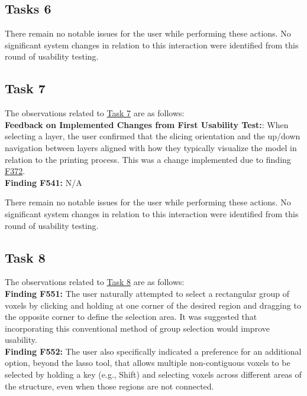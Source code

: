 \documentclass{article}
\begin{document}
\subsection{Tasks 6}

\noindent There remain no notable issues for the user while performing these actions. No significant system changes in relation to this interaction were identified from this round of usability testing.

\subsection{Task 7}

\noindent The observations related to \hyperlink{task:T7}{Task 7} are as follows:\\

\noindent \textbf{Feedback on Implemented Changes from First Usability Test:}: When selecting a layer, the user confirmed that the slicing orientation and the up/down navigation between layers aligned with how they typically visualize the model in relation to the printing process. This was a change implemented due to finding \hyperlink{finding:F372}{F372}.\\

\noindent \hypertarget{finding:F541}{\textbf{Finding F541:}} N/A

\noindent There remain no notable issues for the user while performing these actions. No significant system changes in relation to this interaction were identified from this round of usability testing.

\subsection{Task 8}

\noindent The observations related to \hyperlink{task:T8}{Task 8} are as follows:\\

\noindent \hypertarget{finding:F551}{\textbf{Finding F551:}} 
The user naturally attempted to select a rectangular group of voxels by clicking and holding at one corner of the desired region and dragging to the opposite corner to define the selection area. It was suggested that incorporating this conventional method of group selection would improve usability. \\

\noindent \hypertarget{finding:F552}{\textbf{Finding F552:}} 
The user also specifically indicated a preference for an additional option, beyond the lasso tool, that allows multiple non-contiguous voxels to be selected by holding a key (e.g., Shift) and selecting voxels across different areas of the structure, even when those regions are not connected.\\ 
\end{document}
